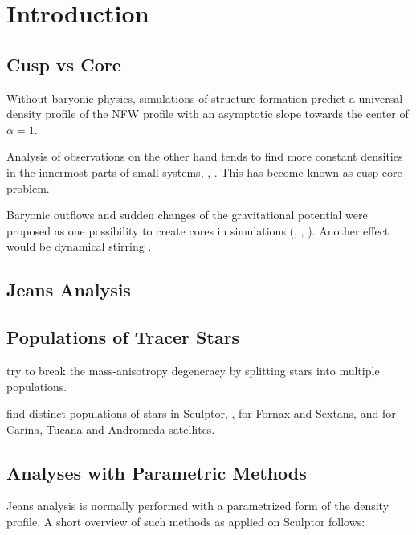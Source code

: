 
\section{Introduction}\label{sec:introduction}
\subsection{Cusp vs Core}
Without baryonic physics, simulations of structure formation predict a
universal density profile of the NFW profile \cite{Moore1999} with an
asymptotic slope towards the center of $\alpha=1$.

Analysis of observations on the other hand tends to find more constant
densities in the innermost parts of small systems,
\cite{FloresPrimack1994}, \cite{Oh+2011}. This has become known as
cusp-core problem.

Baryonic outflows and sudden changes of the gravitational potential
were proposed as one possibility to create cores in simulations
(\cite{Read+2006}, \cite{Pontzen+2013}, \cite{Teyssier}). Another
effect would be dynamical stirring \cite{Goerdt+2006}.


\subsection{Jeans Analysis}


\subsection{Populations of Tracer Stars}
\citet{Battaglia 2008} try to break the mass-anisotropy degeneracy by
splitting stars into multiple populations.

\citet{WalkerPenarrubia2011}




\citep{Tolstoy+2004} find distinct populations of stars in Sculptor,
\citep{Battaglia+2006}, \citep{Battaglia2011} for Fornax and Sextans,
\citep{Harbeck+2001} and \citep{Bellazzini+2001} for Carina, Tucana
and Andromeda satellites.

\subsection{Analyses with Parametric Methods}
Jeans analysis is normally performed with a parametrized form of the
density profile. A short overview of such methods as applied on Sculptor follows:

